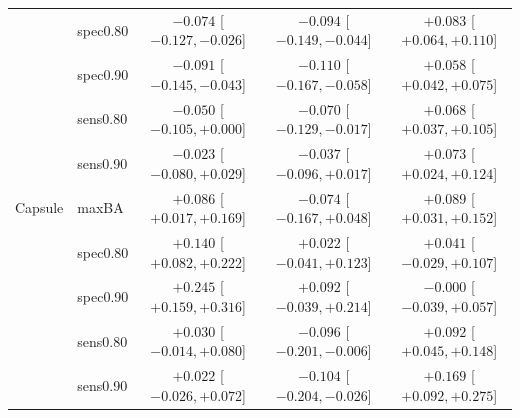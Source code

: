\begin{center}
\begin{tabular}{llccc}
 & spec0.80 & $-0.074$ [$-0.127, -0.026$] & $-0.094$ [$-0.149, -0.044$] & $+0.083$ [$+0.064, +0.110$] \\
 & spec0.90 & $-0.091$ [$-0.145, -0.043$] & $-0.110$ [$-0.167, -0.058$] & $+0.058$ [$+0.042, +0.075$] \\
 & sens0.80 & $-0.050$ [$-0.105, +0.000$] & $-0.070$ [$-0.129, -0.017$] & $+0.068$ [$+0.037, +0.105$] \\
 & sens0.90 & $-0.023$ [$-0.080, +0.029$] & $-0.037$ [$-0.096, +0.017$] & $+0.073$ [$+0.024, +0.124$] \\
\midrule
Capsule & maxBA & $+0.086$ [$+0.017, +0.169$] & $-0.074$ [$-0.167, +0.048$] & $+0.089$ [$+0.031, +0.152$] \\
 & spec0.80 & $+0.140$ [$+0.082, +0.222$] & $+0.022$ [$-0.041, +0.123$] & $+0.041$ [$-0.029, +0.107$] \\
 & spec0.90 & $+0.245$ [$+0.159, +0.316$] & $+0.092$ [$-0.039, +0.214$] & $-0.000$ [$-0.039, +0.057$] \\
 & sens0.80 & $+0.030$ [$-0.014, +0.080$] & $-0.096$ [$-0.201, -0.006$] & $+0.092$ [$+0.045, +0.148$] \\
 & sens0.90 & $+0.022$ [$-0.026, +0.072$] & $-0.104$ [$-0.204, -0.026$] & $+0.169$ [$+0.092, +0.275$] \\
\bottomrule
\end{tabular}\end{center}
